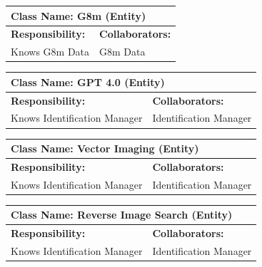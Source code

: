\documentclass[]{article}
\begin{document}
\begin{table}[ht]
    \centering
    \begin{tabular}{|p{5cm}|p{5cm}|}
        \hline
        \multicolumn{2}{|l|}{\textbf{Class Name: G8m (Entity)}} \\
        \hline
        \textbf{Responsibility:} & \textbf{Collaborators:} \\
        \hline
        Knows G8m Data & G8m Data \\
        \hline
    \end{tabular}
\end{table}
 
\begin{table}[ht]
    \centering
    \begin{tabular}{|p{5cm}|p{5cm}|}
        \hline
        \multicolumn{2}{|l|}{\textbf{Class Name: GPT 4.0 (Entity)}} \\
        \hline
        \textbf{Responsibility:} & \textbf{Collaborators:} \\
        \hline
        Knows Identification Manager & Identification Manager \\
        \hline
    \end{tabular}
\end{table}
 
\begin{table}[ht]
    \centering
    \begin{tabular}{|p{5cm}|p{5cm}|}
        \hline
        \multicolumn{2}{|l|}{\textbf{Class Name: Vector Imaging (Entity)}} \\
        \hline
        \textbf{Responsibility:} & \textbf{Collaborators:} \\
        \hline
        Knows Identification Manager & Identification Manager \\
        \hline
    \end{tabular}
\end{table}
 
\begin{table}[ht]
    \centering
    \begin{tabular}{|p{5cm}|p{5cm}|}
        \hline
        \multicolumn{2}{|l|}{\textbf{Class Name: Reverse Image Search (Entity)}} \\
        \hline
        \textbf{Responsibility:} & \textbf{Collaborators:} \\
        \hline
        Knows Identification Manager & Identification Manager \\
        \hline
    \end{tabular}
\end{table}
 
\end{document}
